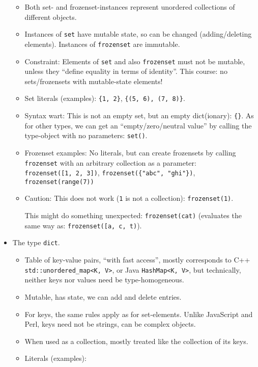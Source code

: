 \documentclass[11pt]{article}
\begin{document}
\begin{itemize}
  \begin{itemize}
  \item
    Both set- and frozenset-instances represent unordered collections of
    different objects.
  \item
    Instances of \texttt{set} have mutable state, so can be changed
    (adding/deleting elements). Instances of \texttt{frozenset} are
    immutable.
  \item
    Constraint: Elements of \texttt{set} and also \texttt{frozenset}
    must not be mutable, unless they ``define equality in terms of
    identity''. This course: no sets/frozensets with mutable-state
    elements!
  \item
    Set literals (examples): \texttt{\{1,\ 2\}},
    \texttt{\{(5,\ 6),\ (7,\ 8)\}}.
  \item
    Syntax wart: This is not an empty set, but an empty dict(ionary):
    \texttt{\{\}}. As for other types, we can get an
    ``empty/zero/neutral value'' by calling the type-object with no
    parameters: \texttt{set()}.
  \item
    Frozenset examples: No literals, but can create frozensets by
    calling \texttt{frozenset} with an arbitrary collection as a
    parameter: \texttt{frozenset({[}1,\ 2,\ 3{]})},
    \texttt{frozenset(\{"abc",\ "ghi"\})}, \texttt{frozenset(range(7))}
  \item
    Caution: This does not work (\texttt{1} is not a collection):
    \texttt{frozenset(1)}.

    This might do something unexpected:
    \texttt{frozenset(\textquotesingle{}cat\textquotesingle{})}
    (evaluates the same way as:
    \texttt{frozenset({[}\textquotesingle{}a\textquotesingle{},\ \textquotesingle{}c\textquotesingle{},\ \textquotesingle{}t\textquotesingle{}{]})}).
  \end{itemize}
\item
  The type \texttt{dict}.

  \begin{itemize}
  \item
    Table of key-value pairs, ``with fast access'', mostly corresponds
    to C++ \texttt{std::unordered\_map\textless{}K,\ V\textgreater{}},
    or Java \texttt{HashMap\textless{}K,\ V\textgreater{}}, but
    technically, neither keys nor values need be type-homogeneous.
  \item
    Mutable, has state, we can add and delete entries.
  \item
    For keys, the same rules apply as for set-elements. Unlike
    JavaScript and Perl, keys need not be strings, can be complex
    objects.
  \item
    When used as a collection, mostly treated like the collection of its
    keys.
  \item
    Literals (examples):


\end{itemize}
\end{itemize}
\end{document}
